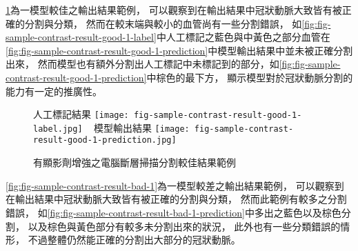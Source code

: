 \documentclass[class=NCU_thesis, crop=false]{standalone}
\begin{document}
\cref{fig:fig-sample-contrast-result-good-1}為一模型較佳之輸出結果範例，
可以觀察到在輸出結果中冠狀動脈大致皆有被正確的分割與分類，
然而在較末端與較小的血管尚有一些分割錯誤，
如\cref{fig:fig-sample-contrast-result-good-1-label}中人工標記之藍色與中黃色之部分血管在\cref{fig:fig-sample-contrast-result-good-1-prediction}中模型輸出結果中並未被正確分割出來，
然而模型也有額外分割出人工標記中未標記到的部分，如\cref{fig:fig-sample-contrast-result-good-1-prediction}中棕色的最下方，
顯示模型對於冠狀動脈分割的能力有一定的推廣性。


\begin{figure}[!hbt]
    \centering
    \subcaptionbox
        {人工標記結果
        \label{fig:fig-sample-contrast-result-good-1-label}}
        {\texttt{[image: fig-sample-contrast-result-good-1-label.jpg]}}
    ~
    \subcaptionbox
        {模型輸出結果
        \label{fig:fig-sample-contrast-result-good-1-prediction}}
        {\texttt{[image: fig-sample-contrast-result-good-1-prediction.jpg]}}
    \caption{有顯影劑增強之電腦斷層掃描分割較佳結果範例}
    \label{fig:fig-sample-contrast-result-good-1}
\end{figure}


\cref{fig:fig-sample-contrast-result-bad-1}為一模型較差之輸出結果範例，
可以觀察到在輸出結果中冠狀動脈大致皆有被正確的分割與分類，
然而此範例有較多之分割錯誤，
如\cref{fig:fig-sample-contrast-result-bad-1-prediction}中多出之藍色以及棕色分割，
以及棕色與黃色部分有較多未分割出來的狀況，
此外也有一些分類錯誤的情形，
不過整體仍然能正確的分割出大部分的冠狀動脈。
\end{document}
